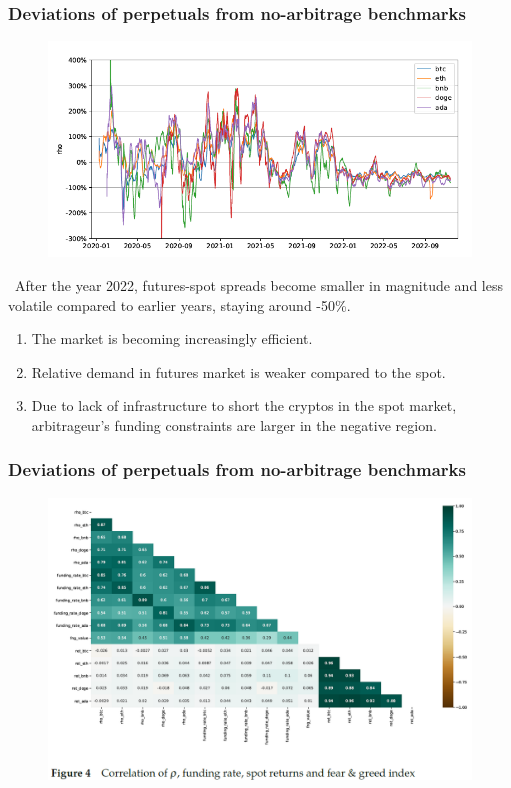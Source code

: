 \documentclass{beamer}
\begin{document}
\begin{frame}
\frametitle{Deviations of perpetuals from no-arbitrage benchmarks}
\begin{figure}
    \includegraphics[width=0.75\linewidth]{figs/Figure3.png}
\end{figure}
~After the year 2022, futures-spot spreads become smaller in magnitude and less volatile compared to earlier years, staying around -50\%.
\begin{enumerate}[i]
    \item The market is becoming increasingly efficient.
    \item Relative demand in futures market is weaker compared to the spot.
    \item Due to lack of infrastructure to short the cryptos in the spot market, arbitrageur's funding constraints are larger in the negative region.
\end{enumerate}
\end{frame}

\begin{frame}
\frametitle{Deviations of perpetuals from no-arbitrage benchmarks}
\begin{figure}
    \includegraphics[width=0.95\linewidth]{figs/Figure4.png}
\end{figure}
\end{frame}
\end{document}
